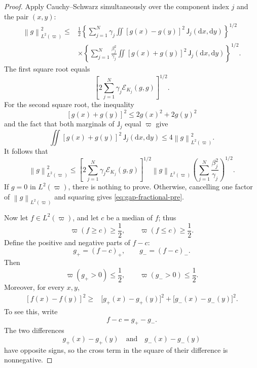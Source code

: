 \documentclass[11pt]{article}
\newcommand{\cE}{\mathcal E}
\newcommand{\norm}[1]{\left\lVert #1\right\rVert}
\newcommand{\1}{\mathbf 1}
\newcommand{\df}{\mathrm{d}}
\begin{document}
\begin{proof}
		Apply Cauchy--Schwarz simultaneously over the component index \(j\)
		and the pair \((x,y)\):
		\[
		\begin{aligned}
			\norm{g}_{L^2(\varpi)}^2
			\leq{}&
			\frac12
			\left\{
			\sum_{j=1}^N
			\gamma_j
			\iint
			[g(x)-g(y)]^2
			\,\mathsf J_j(\df x,\df y)
			\right\}^{1/2}\\
			&\times
			\left\{
			\sum_{j=1}^N
			\frac{\beta_j^2}{\gamma_j}
			\iint
			[g(x)+g(y)]^2
			\,\mathsf J_j(\df x,\df y)
			\right\}^{1/2}.
		\end{aligned}
		\]
		The first square root equals
		\[
		\left[
		2\sum_{j=1}^N
		\gamma_j\cE_{K_j}(g,g)
		\right]^{1/2}.
		\]
		For the second square root, the inequality
		\[
		[g(x)+g(y)]^2
		\leq
		2g(x)^2+2g(y)^2
		\]
		and the fact that both marginals of \(\mathsf J_j\) equal \(\varpi\)
		give
		\[
		\iint
		[g(x)+g(y)]^2
		\,\mathsf J_j(\df x,\df y)
		\leq
		4\norm{g}_{L^2(\varpi)}^2.
		\]
		It follows that
		\[
		\norm{g}_{L^2(\varpi)}^2
		\leq
		\left[
		2\sum_{j=1}^N
		\gamma_j\cE_{K_j}(g,g)
		\right]^{1/2}
		\norm{g}_{L^2(\varpi)}
		\left(
		\sum_{j=1}^N\frac{\beta_j^2}{\gamma_j}
		\right)^{1/2}.
		\]
		If \(g=0\) in \(L^2(\varpi)\), there is nothing to prove.  Otherwise,
		cancelling one factor of \(\norm{g}_{L^2(\varpi)}\) and squaring
		gives \eqref{eq:gap-fractional-pre}.
		
		
		Now let \(f\in L^2(\varpi)\), and let \(c\) be a median of \(f\); thus
		\[
		\varpi(f\geq c)\geq\frac12,
		\qquad
		\varpi(f\leq c)\geq\frac12.
		\]
		Define the positive and negative parts of $f-c$:
		\[
		g_+=(f-c)_+,
		\qquad
		g_-=(f-c)_-.
		\]
		Then
		\[
		\varpi(g_+>0)\leq\frac12,
		\qquad
		\varpi(g_->0)\leq\frac12.
		\]
		Moreover, for every \(x,y\),
		\[
		\begin{aligned}
			[f(x)-f(y)]^2
			\geq{}&
			\bigl[g_+(x)-g_+(y)\bigr]^2
			+
			\bigl[g_-(x)-g_-(y)\bigr]^2.
		\end{aligned}
		\]
		To see this, write
		\[
		f-c=g_+-g_-.
		\]
		The two differences
		\[
		g_+(x)-g_+(y)
		\quad\text{and}\quad
		g_-(x)-g_-(y)
		\]
		have opposite signs, so the cross term in the square of their
		difference is nonnegative.
		

\end{proof}
\end{document}
